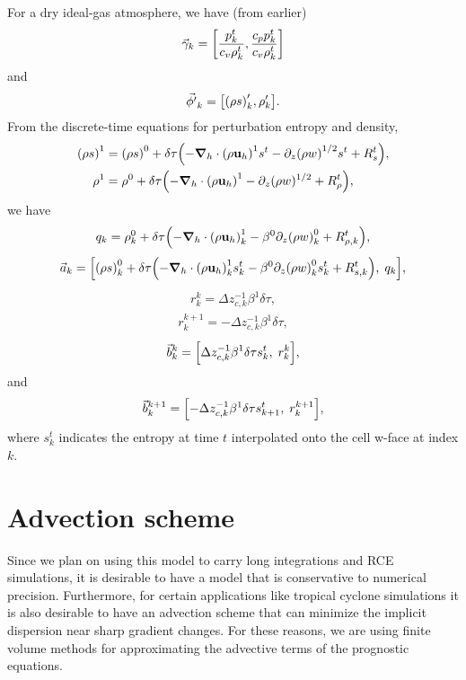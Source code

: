 \documentclass[11pt]{article}
\begin{document}
For a dry ideal-gas atmosphere, we have (from earlier)
\begin{equation}
\vec{\gamma}_k =  \qty [\frac{p^t_k}{c_v \rho^t_k}, \frac{c_p p^t_k}{c_v \rho^t_k} ]
\end{equation}
and
\begin{equation}
\vec{\phi'}_k = \qty [\qty(\rho s)'_k, \rho'_k].
\end{equation}
From the discrete-time equations for perturbation entropy and density,
\begin{align*}
\qty(\rho s)^1 &= \qty(\rho s)^0 + \delta \tau \qty(-\grad_h \cdot \qty(\rho {\bf u}_h)^{1} s^t - \partial_z \qty(\rho w)^{1/2} s^t + R_s^t), \\
\rho^1 &= \rho^0 + \delta \tau \qty(-\grad_h \cdot \qty(\rho {\bf u}_h)^{1} -\partial_z (\rho w)^{1/2} + R_{\rho}^t), \\
\end{align*}
we have
\begin{align}
q_k = \rho^0_k + \delta \tau \qty(-\grad_h \cdot \qty(\rho {\bf u}_h)^{1}_k - \beta^0 \partial_z \qty(\rho w)^0_k + R_{\rho,k}^t),
\end{align}
\begin{align}
\vec{a}_{k} = \qty [ \qty(\rho s)^0_k + \delta \tau \qty(-\grad_h \cdot \qty(\rho {\bf u}_h)^1_k s^t_k - \beta^0 \partial_z \qty(\rho w)^0_k s^t_k + R^t_{s,k}),\;q_k ],
\end{align}
\begin{align}
r^k_k = \Delta z_{c,k}^{-1} \beta^1 \delta \tau,
\end{align}
\begin{align}
r^{k+1}_k = -\Delta z_{c,k}^{-1} \beta^1 \delta \tau,
\end{align}
\begin{align}
\vec{b}^k_k = \qty [\Delta z_{c,k}^{-1} \beta^1 \delta \tau s^t_k ,\; r^k_k],
\end{align}
and
\begin{align}
\vec{b}^{k+1}_k = \qty [-\Delta z_{c,k}^{-1} \beta^1 \delta \tau s^t_{k+1} ,\; r^{k+1}_k],
\end{align}
where $s^t_k$ indicates the entropy at time $t$ interpolated onto the cell w-face at index $k$.

\section{Advection scheme}

Since we plan on using this model to carry long integrations and RCE simulations, it is desirable to have a model that is conservative to numerical precision. Furthermore, for certain applications like tropical cyclone simulations it is also desirable to have an advection scheme that can minimize the implicit dispersion near sharp gradient changes. For these reasons, we are using finite volume methods for approximating the advective terms of the prognostic equations.
\end{document}
